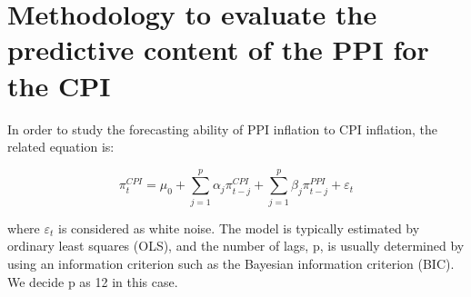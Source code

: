 \documentclass[
]{article}
\begin{document}
\newpage

\hypertarget{methodology-to-evaluate-the-predictive-content-of-the-ppi-for-the-cpi}{%
\section{Methodology to evaluate the predictive content of the PPI for
the
CPI}\label{methodology-to-evaluate-the-predictive-content-of-the-ppi-for-the-cpi}}

In order to study the forecasting ability of PPI inflation to CPI
inflation, the related equation is:

\[\pi_{t}^{C P I}=\mu_{0}+\sum_{j=1}^{p} \alpha_{j} \pi_{t-j}^{C P I}+\sum_{j=1}^{p} \beta_{j} \pi_{t-j}^{P P I}+\varepsilon_{t}\]

where \(\varepsilon_{t}\) is considered as white noise. The model is
typically estimated by ordinary least squares (OLS), and the number of
lags, p, is usually determined by using an information criterion such as
the Bayesian information criterion (BIC). We decide p as 12 in this
case.

\newpage
\end{document}
